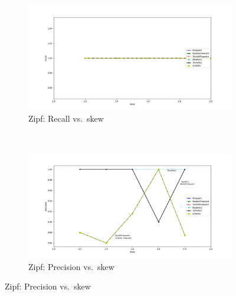 \documentclass[sigconf,review=true,anonymous=true,screen]{acmart}
\begin{document}
\begin{figure}
\begin{subfigure}[b]{0.5\textwidth}
\includegraphics[width=\textwidth]{../Plots/recall_skew.png}
\caption{Zipf: Recall vs.~skew}
\end{subfigure}
~
\begin{subfigure}[b]{0.5\textwidth}
\includegraphics[width=\textwidth]{../Plots/precision_skew.png}
\caption{Zipf: Precision vs.~skew}
\end{subfigure}
\end{figure}
\end{document}
